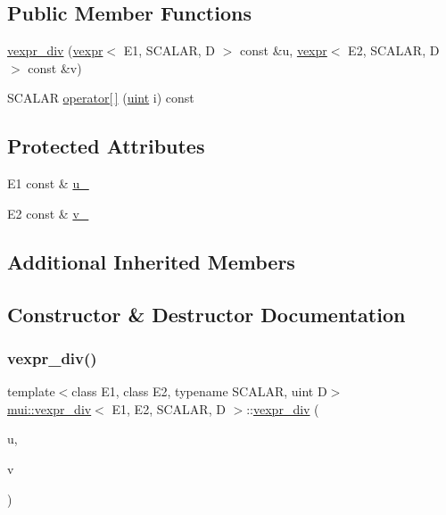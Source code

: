 \subsection*{Public Member Functions}
\begin{DoxyCompactItemize}
\item 
\hyperlink{structmui_1_1vexpr__div_adba13533e11287ff90748aa18dc9a0f7}{vexpr\+\_\+div} (\hyperlink{structmui_1_1vexpr}{vexpr}$<$ E1, S\+C\+A\+L\+AR, D $>$ const \&u, \hyperlink{structmui_1_1vexpr}{vexpr}$<$ E2, S\+C\+A\+L\+AR, D $>$ const \&v)
\item 
S\+C\+A\+L\+AR \hyperlink{structmui_1_1vexpr__div_a4deed6d70b9017bbb9fd9dfa1cb127bd}{operator\mbox{[}$\,$\mbox{]}} (\hyperlink{namespacemui_af15a3e7188a2117fb9965277bb0cacd2}{uint} i) const
\end{DoxyCompactItemize}
\subsection*{Protected Attributes}
\begin{DoxyCompactItemize}
\item 
E1 const  \& \hyperlink{structmui_1_1vexpr__div_aa04d0e1d2c211f12c41a0612103f52fc}{u\+\_\+}
\item 
E2 const  \& \hyperlink{structmui_1_1vexpr__div_aab2211da5c1741663c3c1bfcc76cdb57}{v\+\_\+}
\end{DoxyCompactItemize}
\subsection*{Additional Inherited Members}


\subsection{Constructor \& Destructor Documentation}
\mbox{\label{structmui_1_1vexpr__div_adba13533e11287ff90748aa18dc9a0f7}} 
\subsubsection{\texorpdfstring{vexpr\+\_\+div()}{vexpr\_div()}}
{\footnotesize\ttfamily template$<$class E1, class E2, typename S\+C\+A\+L\+AR, uint D$>$ \\
\hyperlink{structmui_1_1vexpr__div}{mui\+::vexpr\+\_\+div}$<$ E1, E2, S\+C\+A\+L\+AR, D $>$\+::\hyperlink{structmui_1_1vexpr__div}{vexpr\+\_\+div} (\begin{DoxyParamCaption}\item[{\hyperlink{structmui_1_1vexpr}{vexpr}$<$ E1, S\+C\+A\+L\+AR, D $>$ const \&}]{u,  }\item[{\hyperlink{structmui_1_1vexpr}{vexpr}$<$ E2, S\+C\+A\+L\+AR, D $>$ const \&}]{v }\end{DoxyParamCaption})\hspace{0.3cm}{\ttfamily [inline]}}



